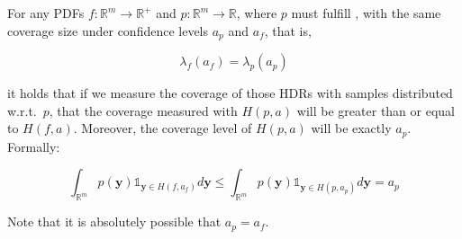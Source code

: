 \begin{lemma}\label{lem:hdr_optimality_mll}
    For any PDFs $f: \mathbb{R}^m \to \mathbb{R}^+$ and $p: \mathbb{R}^m \to \mathbb{R}$, where $p$ must fulfill , with the same coverage size under confidence levels $a_p$ and $a_f$, that is,

    \begin{equation}
        \lambda_f(a_f) = \lambda_p(a_p)
    \end{equation}

    it holds that if we measure the coverage of those HDRs with samples distributed w.r.t.\ $p$, that the coverage measured with $H(p,a)$ will be greater than or equal to $H(f,a)$. Moreover, the coverage level of $H(p,a)$ will be exactly $a_p$. Formally:

    \begin{equation}
        \int_{\mathbb{R}^{m}} p(\mathbf{y}) \mathds1_{\mathbf{y} \in H(f, a_f)} d
        \mathbf{y} \leq \int_{\mathbb{R}^{m}} p(\mathbf{y})
        \mathds1_{\mathbf{y} \in
            H(p, a_p)} d \mathbf{y} = a_p
    \end{equation}
\end{lemma}
Note that it is absolutely possible that $a_p = a_f$.
